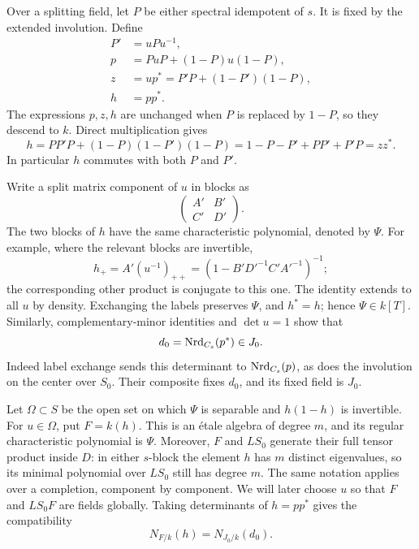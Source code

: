 Over a splitting field, let $P$ be either spectral idempotent of $s$.
It is fixed by the extended involution.  Define
\begin{equation}\label{ind:factor-data}
 \begin{split}
 P'&=uPu^{-1},\\
 p&=PuP+(1-P)u(1-P),\\
 z&=up^*=P'P+(1-P')(1-P),\\
 h&=pp^*.
 \end{split}
\end{equation}
The expressions $p,z,h$ are unchanged when $P$ is replaced by $1-P$,
so they descend to $k$.  Direct multiplication gives
\begin{equation}\label{ind:h-identity}
 h=PP'P+(1-P)(1-P')(1-P)
   =1-P-P'+PP'+P'P=zz^*.
\end{equation}
In particular $h$ commutes with both $P$ and $P'$.

Write a split matrix component of $u$ in blocks as
\[
                         \begin{pmatrix}A'&B'\\C'&D'\end{pmatrix}.
\]
The two blocks of $h$ have the same characteristic polynomial, denoted
by $\Psi$.  For example, where the relevant blocks are invertible,
\begin{equation}\label{ind:h-block}
 h_+=A'(u^{-1})_{++}
       =(1-B'D'^{-1}C'A'^{-1})^{-1};
\end{equation}
the corresponding other product is conjugate to this one.  The identity
extends to all $u$ by density.  Exchanging the labels preserves $\Psi$,
and $h^*=h$; hence $\Psi\in k[T]$.  Similarly, complementary-minor
identities and $\det u=1$ show that
\begin{equation}\label{ind:d0}
                        d_0=\operatorname{Nrd}_{C_s}(p^*)\in J_0.
\end{equation}
Indeed label exchange sends this determinant to $\operatorname{Nrd}_{C_s}(p)$, as
does the involution on the center over $S_0$.  Their composite fixes
$d_0$, and its fixed field is $J_0$.

Let $\Omega\subset S$ be the open set on which $\Psi$ is separable and
$h(1-h)$ is invertible.  For $u\in\Omega$, put $F=k(h)$.  This is an
\'etale algebra of degree $m$, and its regular characteristic polynomial
is $\Psi$.  Moreover, $F$ and $LS_0$ generate their full tensor product
inside $D$: in either $s$-block the element $h$ has $m$ distinct
eigenvalues, so its minimal polynomial over $LS_0$ still has degree $m$.
The same notation applies over a completion, component by component.
We will later choose $u$ so that $F$ and $LS_0F$ are fields globally.
Taking determinants of $h=pp^*$ gives the compatibility
\begin{equation}\label{ind:norm-compatible}
                         N_{F/k}(h)=N_{J_0/k}(d_0).
\end{equation}

